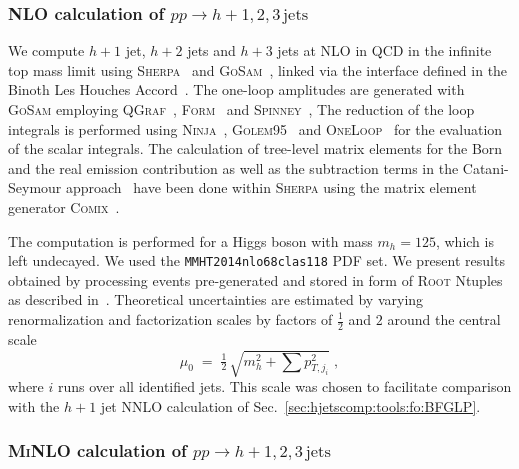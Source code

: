 \subsubsection{NLO calculation of $pp\to h+1,2,3\,\text{jets}$}
\label{sec:hjetscomp:tools:fo:hnj}

We compute $h+1$ jet, $h+2$ jets and
$h+3$ jets at NLO in QCD in the infinite top mass limit 
\cite{vanDeurzen:2013rv,Cullen:2013saa,Greiner:2015jha}
using \textsc{Sherpa}~\cite{Gleisberg:2008ta} and
\textsc{GoSam}~\cite{Cullen:2011ac,Cullen:2014yla}, linked via the
interface defined in the Binoth Les Houches
Accord~\cite{Binoth:2010xt,Alioli:2013nda}.
The one-loop amplitudes are generated with \textsc{GoSam} employing
\textsc{QGraf}~\cite{Nogueira:1991ex},
\textsc{Form}~\cite{Vermaseren:2000nd,Kuipers:2012rf} and
\textsc{Spinney}~\cite{Cullen:2010jv}, The reduction of the loop
integrals is performed using
\textsc{Ninja}~\cite{Mastrolia:2012bu,vanDeurzen:2013saa,Peraro:2014cba},
\textsc{Golem95}~\cite{Heinrich:2010ax,Binoth:2008uq,Cullen:2011kv}
and \textsc{OneLoop}~\cite{vanHameren:2010cp} for the evaluation of
the scalar integrals.
The calculation of tree-level matrix elements for the Born and the
real emission contribution as well as the subtraction terms in the
Catani-Seymour approach~\cite{Catani:1996vz} have been done within
\textsc{Sherpa} using the matrix element generator
\textsc{Comix}~\cite{Gleisberg:2008fv}.

The computation is performed for a Higgs boson with mass
$m_h=125$, which is left undecayed. We used the 
\texttt{MMHT2014nlo68clas118} PDF set. We present results 
obtained by processing events pre-generated and
stored in form of \textsc{Root} Ntuples as described
in~\cite{Bern:2013zja}. Theoretical
uncertainties are estimated by varying renormalization and
factorization scales by factors of $\tfrac{1}{2}$ and $2$ 
around the central scale
\begin{equation}
  \mu_0 \;=\; \tfrac{1}{2}\,\sqrt{m_{h}^2+\sum p_{T,j_i}^2}\;,
\end{equation}
where $i$ runs over all identified jets.
This scale was chosen to facilitate comparison with the $h+1$ jet NNLO
calculation of Sec.\ \ref{sec:hjetscomp:tools:fo:BFGLP}.


\subsubsection{\textsc{MiNLO} calculation of $pp\to h+1,2,3\,\text{jets}$}
\label{sec:hjetscomp:tools:fo:hnjminlo}

